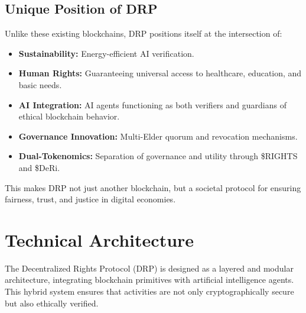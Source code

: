 \documentclass[11pt,a4paper]{article}
\begin{document}
\subsection{Unique Position of DRP}
Unlike these existing blockchains, DRP positions itself at the intersection of:
\begin{itemize}
    \item \textbf{Sustainability:} Energy-efficient AI verification.
    \item \textbf{Human Rights:} Guaranteeing universal access to healthcare, education, and basic needs.
    \item \textbf{AI Integration:} AI agents functioning as both verifiers and guardians of ethical blockchain behavior.
    \item \textbf{Governance Innovation:} Multi-Elder quorum and revocation mechanisms.
    \item \textbf{Dual-Tokenomics:} Separation of governance and utility through \$RIGHTS and \$DeRi.
\end{itemize}

This makes DRP not just another blockchain, but a societal protocol for ensuring fairness, trust, and justice in digital economies.

\section{Technical Architecture}

The Decentralized Rights Protocol (DRP) is designed as a layered and modular architecture, integrating blockchain primitives with artificial intelligence agents. This hybrid system ensures that activities are not only cryptographically secure but also ethically verified. 
\end{document}
